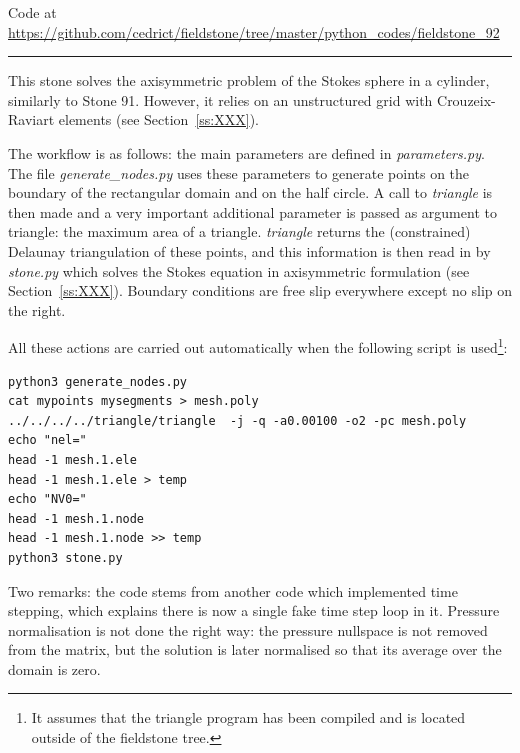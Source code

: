 

\begin{center}
Code at \url{https://github.com/cedrict/fieldstone/tree/master/python_codes/fieldstone_92}
\end{center}

\par\noindent\rule{\textwidth}{0.4pt}



This stone solves the axisymmetric problem of the Stokes sphere in a cylinder, 
similarly to Stone 91. However, it relies on an unstructured grid with 
Crouzeix-Raviart elements (see Section~\ref{ss:XXX}).

The workflow is as follows: the main parameters are defined in {\sl parameters.py}.
The file {\sl generate\_nodes.py} uses these parameters to generate points on the 
boundary of the rectangular domain and on the half circle. 
A call to {\sl triangle} is then made and a very important additional parameter is passed
as argument to triangle: the maximum area of a triangle. 
{\sl triangle} returns the (constrained) Delaunay triangulation of these points, 
and this information is then read in by {\sl stone.py} which solves the 
Stokes equation in axisymmetric formulation (see Section~\ref{ss:XXX}). 
Boundary conditions are free slip everywhere except no slip on the right. 

All these actions are carried out automatically when the following script is 
used\footnote{It assumes that the triangle program has been compiled and 
is located outside of the fieldstone tree.}:
\begin{lstlisting}
python3 generate_nodes.py
cat mypoints mysegments > mesh.poly
../../../../triangle/triangle  -j -q -a0.00100 -o2 -pc mesh.poly
echo "nel="
head -1 mesh.1.ele 
head -1 mesh.1.ele > temp
echo "NV0="
head -1 mesh.1.node 
head -1 mesh.1.node >> temp
python3 stone.py
\end{lstlisting}

Two remarks: the code stems from another code which implemented time stepping, 
which explains there is now a single fake time step loop in it. 
Pressure normalisation is not done the right way: the pressure nullspace is 
not removed from the matrix, but the solution is later normalised so that 
its average over the domain is zero.

